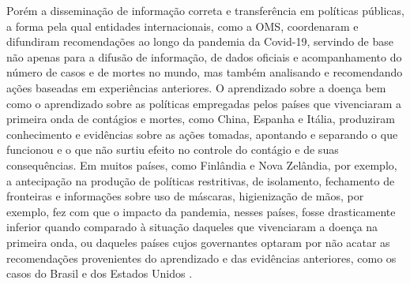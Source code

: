 Porém a disseminação de informação correta e transferência em políticas públicas, a forma pela qual entidades internacionais, como a OMS, coordenaram e difundiram recomendações ao longo da pandemia da Covid-19, servindo de base não apenas para a difusão de informação, de dados oficiais e acompanhamento do número de casos e de mortes no mundo, mas também analisando e recomendando ações baseadas em experiências anteriores. O aprendizado sobre a doença bem como o aprendizado sobre as políticas empregadas pelos países que vivenciaram a primeira onda de contágios e mortes, como China, Espanha e Itália, produziram conhecimento e evidências sobre as ações tomadas, apontando e separando o que funcionou e o que não surtiu efeito no controle do contágio e de suas consequências. Em muitos países, como Finlândia e Nova Zelândia, por exemplo, a antecipação na produção de políticas restritivas, de isolamento, fechamento de fronteiras e informações sobre uso de máscaras, higienização de mãos, por exemplo, fez com que o impacto da pandemia, nesses países, fosse drasticamente inferior quando comparado à situação daqueles que vivenciaram a doença na primeira onda, ou daqueles países cujos governantes optaram por não acatar as recomendações provenientes do aprendizado e das evidências anteriores, como os casos do Brasil e dos Estados Unidos \cite{brasil2020estudos}. 
